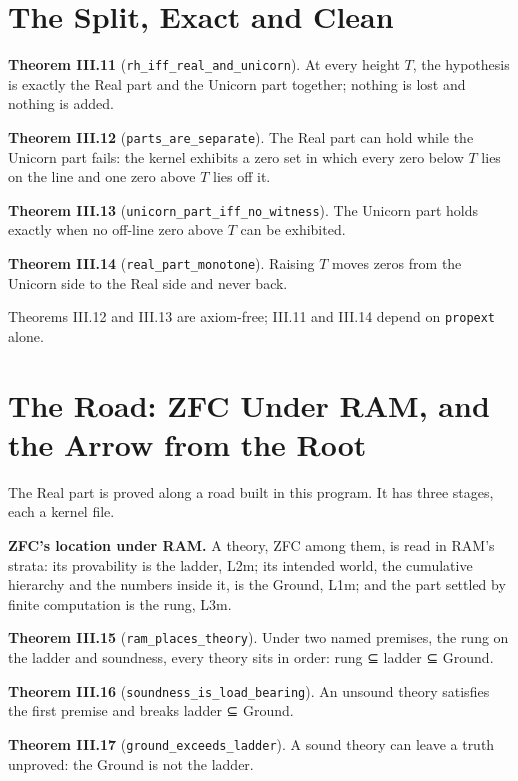 \documentclass[10pt]{article}
\begin{document}
\hypertarget{the-split-exact-and-clean}{%
\section{The Split, Exact and Clean}\label{the-split-exact-and-clean}}

\textbf{Theorem III.11} (\texttt{rh\_iff\_real\_and\_unicorn}). At every
height \(T\), the hypothesis is exactly the Real part and the Unicorn
part together; nothing is lost and nothing is added.

\textbf{Theorem III.12} (\texttt{parts\_are\_separate}). The Real part
can hold while the Unicorn part fails: the kernel exhibits a zero set in
which every zero below \(T\) lies on the line and one zero above \(T\)
lies off it.

\textbf{Theorem III.13} (\texttt{unicorn\_part\_iff\_no\_witness}). The
Unicorn part holds exactly when no off-line zero above \(T\) can be
exhibited.

\textbf{Theorem III.14} (\texttt{real\_part\_monotone}). Raising \(T\)
moves zeros from the Unicorn side to the Real side and never back.

Theorems III.12 and III.13 are axiom-free; III.11 and III.14 depend on
\texttt{propext} alone.

\hypertarget{the-road-zfc-under-ram-and-the-arrow-from-the-root}{%
\section{The Road: ZFC Under RAM, and the Arrow from the
Root}\label{the-road-zfc-under-ram-and-the-arrow-from-the-root}}

The Real part is proved along a road built in this program. It has three
stages, each a kernel file.

\textbf{ZFC's location under RAM.} A theory, ZFC among them, is read in
RAM's strata: its provability is the ladder, L2m; its intended world,
the cumulative hierarchy and the numbers inside it, is the Ground, L1m;
and the part settled by finite computation is the rung, L3m.

\textbf{Theorem III.15} (\texttt{ram\_places\_theory}). Under two named
premises, the rung on the ladder and soundness, every theory sits in
order: rung ⊆ ladder ⊆ Ground.

\textbf{Theorem III.16} (\texttt{soundness\_is\_load\_bearing}). An
unsound theory satisfies the first premise and breaks ladder ⊆ Ground.

\textbf{Theorem III.17} (\texttt{ground\_exceeds\_ladder}). A sound
theory can leave a truth unproved: the Ground is not the ladder.
\end{document}
